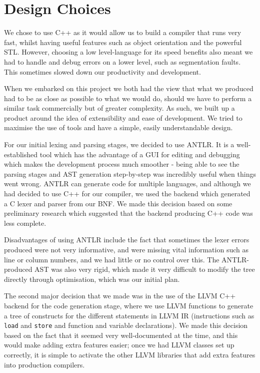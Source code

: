 \documentclass[a4wide, 11pt]{article}
\begin{document}
\section{Design Choices}

We chose to use C++ as it would allow us to build a compiler that runs very fast, whilst having useful features such as object orientation and the powerful STL. However, choosing a low level-language for its speed benefits also meant we had to handle and debug errors on a lower level, such as segmentation faults. This sometimes slowed down our productivity and development.

When we embarked on this project we both had the view that what we produced had to be as close as possible to what we would do, should we have to perform a similar task commercially but of greater complexity. As such, we built up a product around the idea of extensibility and ease of development. We tried to maximise the use of tools and have a simple, easily understandable design.

For our initial lexing and parsing stages, we decided to use ANTLR. It is a well-established tool which has the advantage of a GUI for editing and debugging which makes the development process much smoother - being able to see the parsing stages and AST generation step-by-step was incredibly useful when things went wrong. ANTLR can generate code for multiple languages, and although we had decided to use C++ for our compiler, we used the backend which generated a C lexer and parser from our BNF. We made this decision based on some preliminary research which suggested that the backend producing C++ code was less complete. 

Disadvantages of using ANTLR include the fact that sometimes the lexer errors produced were not very informative, and were missing vital information such as line or column numbers, and we had little or no control over this. The ANTLR-produced AST was also very rigid, which made it very difficult to modify the tree directly through optimisation, which was our initial plan.

The second major decision that we made was in the use of the LLVM C++ backend for the code generation stage, where we use LLVM functions to generate a tree of constructs for the different statements in LLVM IR (instructions such as \texttt{load} and \texttt{store} and function and variable declarations). We made this decision based on the fact that it seemed very well-documented at the time, and this would make adding extra features easier; once we had LLVM classes set up correctly, it is simple to activate the other LLVM libraries that add extra features into production compilers.
\end{document}
